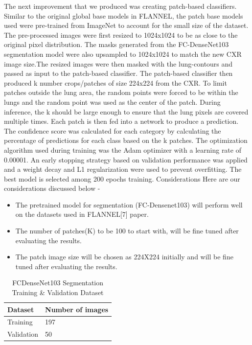 \documentclass{sigkddExp}
\begin{document}
The next improvement that we produced was creating patch-based classifiers.
Similar to the original global base models in FLANNEL, the patch base models
used were pre-trained from ImageNet to account for the small size of the
dataset. The pre-processed images were first resized to 1024x1024 to be as close
to the original pixel distribution. The masks generated from the FC-DenseNet103
segmentation model were also upsampled to 1024x1024 to match the new CXR image
size.The resized images were then masked with the lung-contours and passed as
input to the patch-based classifier. The patch-based classifier then produced k
number crops/patches of size 224x224 from the CXR. To limit patches outside the
lung area, the random points were forced to be within the lungs and the random
point was used as the center of the patch. During inference, the k should be
large enough to ensure that the lung pixels are covered multiple times. Each
patch is then fed into a network to produce a prediction. The confidence score
was calculated for each category by calculating the percentage of predictions
for each class based on the k patches. The optimization algorithm used during
training was the Adam optimizer with a learning rate of 0.00001. An early
stopping strategy based on validation performance was applied and a weight decay
and L1 regularization were used to prevent overfitting. The best model is
selected among 200 epochs training. Considerations Here are our considerations
discussed below -
\begin{itemize}
    \item The pretrained model for segmentation (FC-Densenet103) will perform
    well on the datasets used in FLANNEL[7] paper.
    \item The number of patches(K) to be 100 to start with, will be fine tuned
    after evaluating the results.
    \item The patch image size will be chosen as 224X224 initially and will be
    fine tuned after evaluating the results.
\end{itemize}
  




\begin{table}
    \caption{FC\-DenseNet103 Segmentation Training \& Validation Dataset}
    \label{table:segdata}
    \begin{tabular}{ll} \hline
        Dataset & Number of images \\ \hline
        Training & 197 \\
        Validation & 50 \\
        \hline
    \end{tabular}

\end{table}
\end{document}
